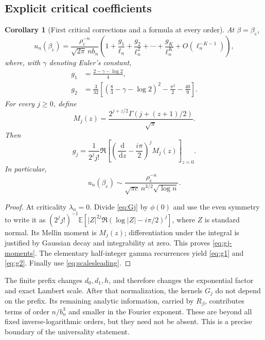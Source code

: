 \documentclass[11pt,a4paper]{article}
\numberwithin{equation}{section}
\newtheorem{corollary}[theorem]{Corollary}
\theoremstyle{definition}
\theoremstyle{remark}
\newcommand{\E}{\mathbb E}
\newcommand{\dd}{\,\mathrm d}
\newcommand{\bc}{\beta_{\mathrm c}}
\newcommand{\rhoc}{\rho_{\mathrm c}}
\newcommand{\ph}{\phi}
\begin{document}
\subsection{Explicit critical coefficients}
\begin{corollary}[First critical corrections and a formula at every order]
\label{cor:criticalcoeff}
At $\beta=\bc$,
\begin{equation}\label{eq:criticalcoeff}
 u_n(\bc)=\frac{\rhoc^{-n}}{\sqrt{2\pi}\,n b_n}
 \left(1+\frac{g_1}{\ell_n}+\frac{g_2}{\ell_n^2}
       +\cdots+\frac{g_K}{\ell_n^K}+O(\ell_n^{-K-1})\right),
\end{equation}
where, with $\gamma$ denoting Euler's constant,
\begin{align}
 g_1&=\frac{2-\gamma-\log2}{4},\label{eq:g1}\\
 g_2&=\frac3{32}\left[
    \left(\frac83-\gamma-\log2\right)^2
                -\frac{\pi^2}{2}-\frac{40}{9}\right].\label{eq:g2}
\end{align}
For every $j\ge0$, define
\[
 M_j(z)=\frac{2^{j+z/2}\Gamma(j+(z+1)/2)}{\sqrt\pi}.
\]
Then
\begin{equation}\label{eq:gj-moments}
 g_j=\frac1{2^j j!}\Re\left[
       \left(\frac{\dd}{\dd z}-\frac{i\pi}{2}\right)^j M_j(z)
                            \right]_{z=0}.
\end{equation}
In particular,
\begin{equation}\label{eq:leadingsector}
 u_n(\bc)\sim\frac{\rhoc^{-n}}
 {\sqrt{\pi c}\,n^{3/2}\sqrt{\log n}}.
\end{equation}
\end{corollary}
\begin{proof}
At criticality $\lambda_n=0$. Divide \eqref{eq:Gj} by $\ph(0)$ and
use the even symmetry to write it as
$(2^j j!)^{-1}\E[|Z|^{2j}\Re(\log|Z|-i\pi/2)^j]$, where $Z$ is
standard normal. Its Mellin moment is $M_j(z)$; differentiation under
the integral is justified by Gaussian decay and integrability at zero.
This proves \eqref{eq:gj-moments}. The elementary half-integer gamma
recurrences yield \eqref{eq:g1} and \eqref{eq:g2}. Finally use
\eqref{eq:scalesleading}.
\end{proof}

The finite prefix changes $d_0,d_1,h$, and therefore changes the
exponential factor and exact Lambert scale. After that normalization,
the kernels $G_j$ do not depend on the prefix. Its remaining analytic
information, carried by $R_\beta$, contributes terms of order
$n/b_n^3$ and smaller in the Fourier exponent. These are beyond all
fixed inverse-logarithmic orders, but they need not be absent. This is
a precise boundary of the universality statement.
\end{document}
